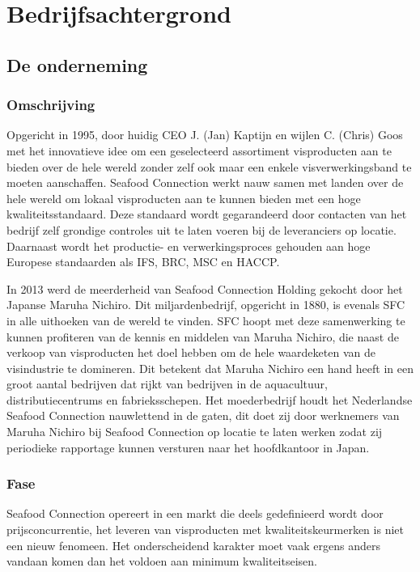 \chapter{Bedrijfsachtergrond}
\section{De onderneming}
\subsection{Omschrijving}
Opgericht in 1995, door huidig CEO J. (Jan) Kaptijn en wijlen C. (Chris) Goos met het innovatieve idee om een geselecteerd assortiment visproducten aan te bieden over de hele wereld zonder zelf ook maar een enkele visverwerkingsband te moeten aanschaffen. Seafood Connection werkt nauw samen met landen over de hele wereld om lokaal visproducten aan te kunnen bieden met een hoge kwaliteitsstandaard. Deze standaard wordt gegarandeerd door contacten van het bedrijf zelf grondige controles uit te laten voeren bij de leveranciers op locatie. Daarnaast wordt het productie- en verwerkingsproces gehouden aan hoge Europese standaarden als IFS, BRC, MSC en HACCP. \citep{sfcwebsite}

In 2013 werd de meerderheid van Seafood Connection Holding gekocht door het Japanse Maruha Nichiro. Dit miljardenbedrijf, opgericht in 1880, is evenals SFC in alle uithoeken van de wereld te vinden. SFC hoopt met deze samenwerking te kunnen profiteren van de kennis en middelen van Maruha Nichiro, die naast de verkoop van visproducten het doel hebben om de hele waardeketen van de visindustrie te domineren. Dit betekent dat Maruha Nichiro een hand heeft in een groot aantal bedrijven dat rijkt van bedrijven in de aquacultuur, distributiecentrums en fabrieksschepen. Het moederbedrijf houdt het Nederlandse Seafood Connection nauwlettend in de gaten, dit doet zij door werknemers van Maruha Nichiro bij Seafood Connection op locatie te laten werken zodat zij periodieke rapportage kunnen versturen naar het hoofdkantoor in Japan. \citep{sfcwebsite,Visserijnieuws}

\subsection{Fase}
Seafood Connection opereert in een markt die deels gedefinieerd wordt door prijsconcurrentie, het leveren van visproducten met kwaliteitskeurmerken is niet een nieuw fenomeen. Het onderscheidend karakter moet vaak ergens anders vandaan komen dan het voldoen aan minimum kwaliteitseisen. 

